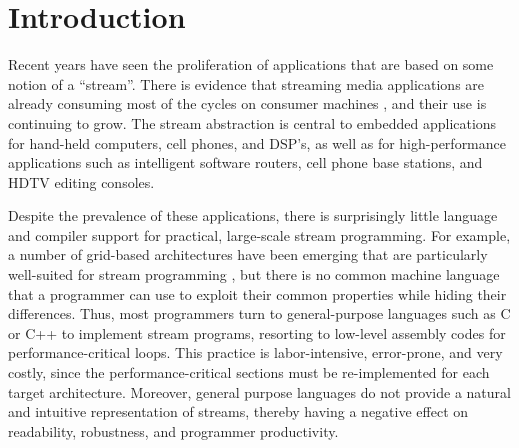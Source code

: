 \section{Introduction}

Recent years have seen the proliferation of applications that are
based on some notion of a ``stream''.  There is evidence that
streaming media applications are already consuming most of the cycles
on consumer machines \cite{Rix98}, and their use is continuing to
grow.  The stream abstraction is central to embedded applications for
hand-held computers, cell phones, and DSP's, as well as for
high-performance applications such as intelligent software routers,
cell phone base stations, and HDTV editing consoles.

Despite the prevalence of these applications, there is surprisingly
little language and compiler support for practical, large-scale stream
programming.  For example, a number of grid-based architectures have
been emerging that are particularly well-suited for stream programming
\cite{raw, smartmemories, trips}, but there is no common machine
language that a programmer can use to exploit their common properties
while hiding their differences.  Thus, most programmers turn to
general-purpose languages such as C or C++ to implement stream
programs, resorting to low-level assembly codes for
performance-critical loops.  This practice is labor-intensive,
error-prone, and very costly, since the performance-critical sections
must be re-implemented for each target architecture.  Moreover,
general purpose languages do not provide a natural and intuitive
representation of streams, thereby having a negative effect on
readability, robustness, and programmer productivity.

